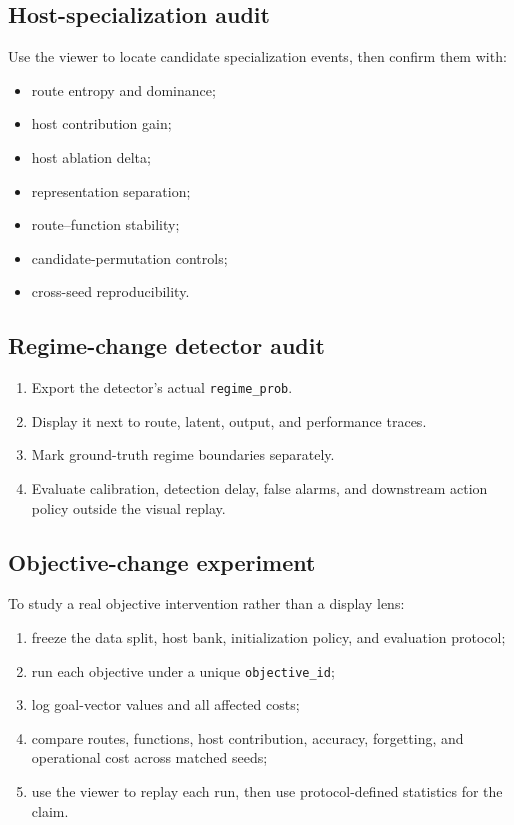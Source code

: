 \documentclass[11pt,a4paper]{article}
\newcommand{\code}[1]{\texttt{#1}}
\begin{document}
\subsection{Host-specialization audit}

Use the viewer to locate candidate specialization events, then confirm them with:

\begin{itemize}
  \item route entropy and dominance;
  \item host contribution gain;
  \item host ablation delta;
  \item representation separation;
  \item route--function stability;
  \item candidate-permutation controls;
  \item cross-seed reproducibility.
\end{itemize}

\subsection{Regime-change detector audit}

\begin{enumerate}
  \item Export the detector's actual \code{regime\_prob}.
  \item Display it next to route, latent, output, and performance traces.
  \item Mark ground-truth regime boundaries separately.
  \item Evaluate calibration, detection delay, false alarms, and downstream action policy outside the visual replay.
\end{enumerate}

\subsection{Objective-change experiment}

To study a real objective intervention rather than a display lens:

\begin{enumerate}
  \item freeze the data split, host bank, initialization policy, and evaluation protocol;
  \item run each objective under a unique \code{objective\_id};
  \item log goal-vector values and all affected costs;
  \item compare routes, functions, host contribution, accuracy, forgetting, and operational cost across matched seeds;
  \item use the viewer to replay each run, then use protocol-defined statistics for the claim.
\end{enumerate}
\end{document}
